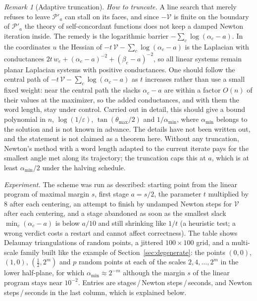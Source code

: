 \documentclass[11pt]{amsart}
\theoremstyle{definition}
\theoremstyle{remark}
\newtheorem{remark}[theorem]{Remark}
\newcommand{\eps}{\varepsilon}
\begin{document}
\begin{remark}[Adaptive truncation]
\emph{How to truncate.} A line search that merely refuses to leave $\mathcal P'_a$ can stall on its faces, and since $-\mathcal V$ is finite on the boundary of $\mathcal P'_a$ the theory of self-concordant functions does not keep a damped Newton iteration inside.
The remedy is the logarithmic barrier $-\sum_c\log(\alpha_c-a)$. In the coordinates $u$ the Hessian of $-t\,\mathcal V-\sum_c\log(\alpha_c-a)$ is the Laplacian with conductances $2t\,w_e+(\alpha_e-a)^{-2}+(\beta_e-a)^{-2}$, so all linear systems remain planar Laplacian systems with positive conductances.
One should follow the central path of $-t\,\mathcal V-\sum_c\log(\alpha_c-a)$ as $t$ increases rather than use a small fixed weight: near the central path the slacks $\alpha_c-a$ are within a factor $O(n)$ of their values at the maximizer, so the added conductances, and with them the word length, stay under control.
Carried out in detail, this should give a bound polynomial in $n$, $\log(1/\eps)$, $\tan(\theta_{\max}/2)$ and $1/\alpha_{\min}$, where $\alpha_{\min}$ belongs to the solution and is not known in advance. The details have not been written out, and the statement is not claimed as a theorem here.
Without any truncation, Newton's method with a word length adapted to the current iterate pays for the smallest angle met along its trajectory; the truncation caps this at $a$, which is at least $\alpha_{\min}/2$ under the halving schedule.

\emph{Experiment.} The scheme was run as described: starting point from the linear program of maximal margin $s$, first stage $a=s/2$, the parameter $t$ multiplied by $8$ after each centering, an attempt to finish by undamped Newton steps for $\mathcal V$ after each centering, and a stage abandoned as soon as the smallest slack $\min_c(\alpha_c-a)$ is below $a/10$ and
still shrinking like $1/t$ (a heuristic test; a wrong verdict costs a restart and cannot affect correctness). The table shows Delaunay triangulations of random points, a jittered $100\times100$ grid, and a multi-scale family built like the example of Section~\ref{sec:degenerate}: the points $(0,0)$, $(1,0)$, $(\frac12,2^m)$ and $p$ random points at each of the scales $2,4,\dots,2^m$ in the lower half-plane,
for which $\alpha_{\min}\approx2^{-m}$ although the margin $s$ of the linear program stays near $10^{-2}$. Entries are stages\,/\,Newton steps\,/\,seconds, and Newton steps\,/\,seconds in the last column, which is explained below.


\end{remark}
\end{document}

